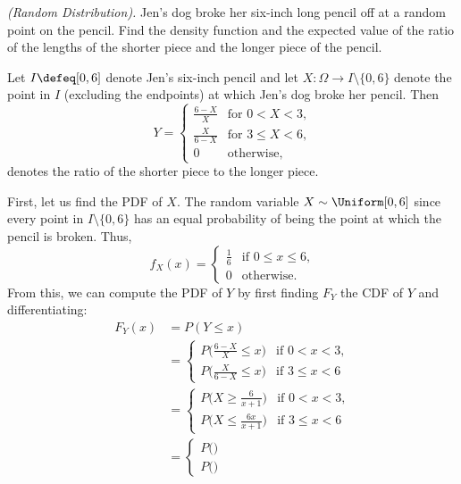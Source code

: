 \begin{problem}[Handout 12, \# 19]
  \emph{(Random Distribution).} Jen's dog broke her six-inch long pencil
  off at a random point on the pencil. Find the density function and the
  expected value of the ratio of the lengths of the shorter piece and the
  longer piece of the pencil.
\end{problem}
\begin{solution}
  Let \(I\defeq [0,6]\) denote Jen's six-inch pencil and let
  \(X\colon\Omega\to I\setminus\{0,6\}\) denote the point in \(I\)
  (excluding the endpoints) at which Jen's dog broke her pencil. Then
  \[
    Y=
    \begin{cases}
      \frac{6-X}{X}&\text{for \(0<X<3\),}\\
      \frac{X}{6-X}&\text{for \(3\leq X<6\),}\\
      0&\text{otherwise,}
    \end{cases}
  \]
  denotes the ratio of the shorter piece to the longer piece.

  First, let us find the PDF of \(X\). The random variable
  \(X\sim\Uniform[0,6]\) since every point in \(I\setminus\{0,6\}\) has an
  equal probability of being the point at which the pencil is broken. Thus,
  \[
    f_X(x)=
    \begin{cases}
      \frac{1}{6}&\text{if \(0\leq x\leq 6\),}\\
      0&\text{otherwise.}
    \end{cases}
  \]
  From this, we can compute the PDF of \(Y\) by first finding \(F_Y\) the
  CDF of \(Y\) and differentiating:
  \begin{align*}
    F_Y(x)
    &=P(Y\leq x)\\
    &=\begin{cases}
        P\bigl(\frac{6-X}{X}\leq x\bigr)&\text{if \(0<x<3\),}\\
        P\bigl(\frac{X}{6-X}\leq x\bigr)&\text{if \(3\leq x<6\)}
      \end{cases}\\
    &=\begin{cases}
      P\bigl(X\geq\frac{6}{x+1}\bigr)&\text{if \(0<x<3\),}\\
      P\bigl(X\leq\frac{6x}{x+1}\bigr)&\text{if \(3\leq x<6\)}
    \end{cases}\\
    &=\begin{cases}
      P\bigl(\bigr)&\\
      P\bigl(\bigr)&
      \end{cases}
  \end{align*}


\end{solution}
